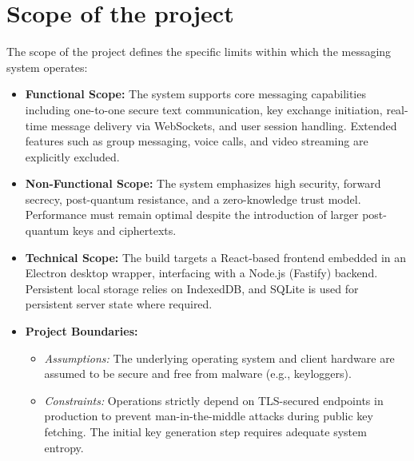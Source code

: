 \section{Scope of the project}
The scope of the project defines the specific limits within which the messaging system operates:

\begin{itemize}
	\item \textbf{Functional Scope:} The system supports core messaging capabilities including one-to-one secure text communication, key exchange initiation, real-time message delivery via WebSockets, and user session handling. Extended features such as group messaging, voice calls, and video streaming are explicitly excluded.
	\item \textbf{Non-Functional Scope:} The system emphasizes high security, forward secrecy, post-quantum resistance, and a zero-knowledge trust model. Performance must remain optimal despite the introduction of larger post-quantum keys and ciphertexts.
	\item \textbf{Technical Scope:} The build targets a React-based frontend embedded in an Electron desktop wrapper, interfacing with a Node.js (Fastify) backend. Persistent local storage relies on IndexedDB, and SQLite is used for persistent server state where required.
	\item \textbf{Project Boundaries:}
		\begin{itemize}
			\item \textit{Assumptions:} The underlying operating system and client hardware are assumed to be secure and free from malware (e.g., keyloggers).
			\item \textit{Constraints:} Operations strictly depend on TLS-secured endpoints in production to prevent man-in-the-middle attacks during public key fetching. The initial key generation step requires adequate system entropy.
		\end{itemize}
\end{itemize}
